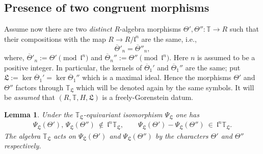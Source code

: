 \documentclass[11pt]{amsart}
\newtheorem{lemma}{Lemma}[section]
\begin{document}
\subsection{Presence of two congruent morphisms}
	Assume now there are two \textit{distinct} $R$-algebra morphisms $\Theta', \Theta'': \mathbb{T} \rightarrow R$ 
	such that their compositions with the map $R \rightarrow R/\mathfrak{l}^n$ are the same, i.e.,
	\[ \overline{\Theta}'_n = \overline{\Theta}''_n, \]
	where, $\overline{\Theta}'_n := {\Theta'}\pmod{\mathfrak{l}^n}$ and $\overline{\Theta}_n'' := {\Theta''}\pmod{\mathfrak{l}^n}.$ Here $n$ is assumed to be a positive integer. In particular,
	the kernels of $\overline{\Theta}_1'$ and $\overline{\Theta}_1''$ are the same; 
	put $\mathfrak{L} := \ker{\overline{\Theta}_1' = \ker{\overline{\Theta}_1''}}$ which is a maximal ideal. Hence the morphisms $\Theta'$ and $\Theta''$ factors through $\mathbb{T}_\mathfrak{L}$ which will be denoted again by the same symbols. It will be \textit{assumed} that $(R, \mathbb{T}, H, \mathfrak{L})$ is a freely-Gorenstein datum.

	\begin{lemma}
	\label{lem:theta'-theta''}
		Under the $\mathbb{T}_\mathfrak{L}$-equivariant isomorphism  $\Psi_\mathfrak{L}$ one has
		\begin{gather*}
			\Psi_\mathfrak{L}(\Theta'), \, \Psi_\mathfrak{L}(\Theta'') \ \not\in \ \mathfrak{l}^n\mathbb{T}_{\mathfrak{L}},\qquad
			\Psi_\mathfrak{L}(\Theta') - \Psi_\mathfrak{L}(\Theta'') \ \in \ \mathfrak{l}^n \mathbb{T}_{\mathfrak{L}}.
		\end{gather*}
		The algebra $\mathbb{T}_\mathfrak{L}$ acts on $\Psi_\mathfrak{L}(\Theta')$ and $\Psi_\mathfrak{L}(\Theta'')$ by the characters 
		$\Theta'$ and $\Theta''$  respectively.
	\end{lemma}
	
\end{document}
